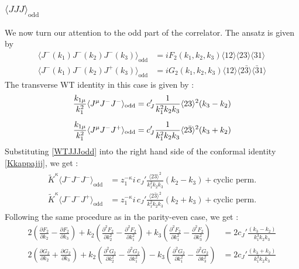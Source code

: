 \documentclass[a4paper,11pt]{article}
\begin{document}
\subsubsection*{$\langle JJJ \rangle_{\text{odd}}$}
We now turn our attention to the odd part of the correlator. The ansatz is given by
\begin{align}\label{jjjoddansatz}
    \langle J^-(k_1) J^-(k_2)J^-(k_3) \rangle_{\text{odd}} &=iF_2(k_1, k_2, k_3)\langle 12 \rangle \langle 23 \rangle \langle 31 \rangle\\
\langle J^-(k_1) J^-(k_2)J^+(k_3) \rangle_{\text{odd}} &=iG_2(k_1, k_2, k_3)\langle 12 \rangle \langle 2\bar{3} \rangle \langle \bar{3}1 \rangle
\end{align}
The transverse WT identity in this case is given by :
\begin{align}\label{WTJJJodd}
   \frac{k_{1\mu}}{k_1^2}\langle J^{\mu} J^- J^- \rangle_{\text{odd}}&= c'_J\frac{1}{k_1^2 k_2 k_3}\langle 23 \rangle^2(k_3-k_2)\notag \\[5 pt]
    \frac{k_{1\mu}}{k_1^2}\langle J^{\mu} J^- J^+\rangle_{\text{odd}}&= c'_J\frac{1}{k_1^2 k_2 k_3}\langle 2\bar{3} \rangle^2(k_3+k_2)
\end{align}
Substituting \eqref{WTJJJodd} into the right hand side of the conformal identity \eqref{Kkappajjj}, we get :
\begin{align}
\begin{split}
\widetilde{K}^{\kappa} \langle J^- J^- J^- \rangle_{\text{odd}} &= z_1^{-\kappa}i\,c_{J}'\frac{\langle 23 \rangle^2}{k_1^2 k_2 k_3}(k_2-k_3)+\text{cyclic perm.}\\[5 pt]
\widetilde{K}^{\kappa} \langle J^- J^- J^+ \rangle_{\text{odd}} &= z_1^{-\kappa}i\,c_{J}'\frac{\langle 2\bar{3} \rangle^2}{k_1^2 k_2 k_3}(k_2+k_3)+\text{cyclic perm.}
\end{split}
\end{align}
Following the same procedure as in the parity-even case, we get :
\begin{align}
2\left(\frac{\partial F_2}{\partial k_2}-\frac{\partial F_2}{\partial k_3}\right)+k_2\left(\frac{\partial^2 F_2}{\partial k_2^2}-\frac{\partial^2 F_2}{\partial k_1^2}\right)+k_3\left(\frac{\partial^2 F_2}{\partial k_1^2}-\frac{\partial^2 F_2}{\partial k_3^2}\right)&=2c_J'\frac{(k_3-k_2)}{k_1^3 k_2 k_3}\label{Feqn1od}\\[5 pt]
2\left(\frac{\partial G_2}{\partial k_2}+\frac{\partial G_2}{\partial k_3}\right)+k_2\left(\frac{\partial^2 G_2}{\partial k_2^2}-\frac{\partial^2 G_2}{\partial k_1^2}\right)-k_3\left(\frac{\partial^2 G_2}{\partial k_1^2}-\frac{\partial^2 G_2}{\partial k_3^2}\right)&=2 c_J'\frac{(k_3+k_2)}{k_1^3 k_2 k_3}\label{Geqn1od}
\end{align}
\end{document}
